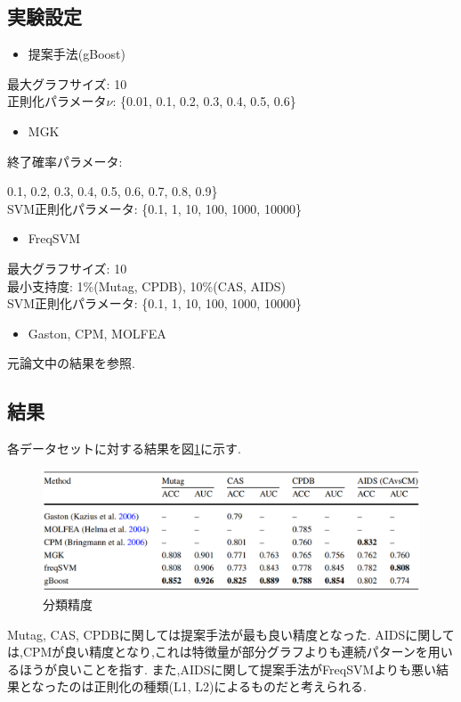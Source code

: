 \documentclass{zasshi-prml3}
\theoremstyle{definition}
\begin{document}
\subsection{実験設定}
\begin{itemize}
	\item 提案手法(gBoost)
\end{itemize}
最大グラフサイズ: 10\\
正則化パラメータ$\nu$: \{0.01, 0.1, 0.2, 0.3, 0.4, 0.5, 0.6\}
\begin{itemize}
	\item MGK
\end{itemize}
終了確率パラメータ: {0.1, 0.2, 0.3, 0.4, 0.5, 0.6, 0.7, 0.8, 0.9\}\\
SVM正則化パラメータ: \{0.1, 1, 10, 100, 1000, 10000\}
\begin{itemize}
	\item FreqSVM
\end{itemize}
最大グラフサイズ: 10\\
最小支持度: 1\%(Mutag, CPDB), 10\%(CAS, AIDS)\\
SVM正則化パラメータ: \{0.1, 1, 10, 100, 1000, 10000\}
\begin{itemize}
	\item Gaston, CPM, MOLFEA
\end{itemize}
元論文中の結果を参照.

\subsection{結果}
各データセットに対する結果を図\ref{performance}に示す.
\begin{figure}[t]
	\centering
	\includegraphics[width=150mm]{figure/performance.png}
	\caption{分類精度}
	\label{performance}
\end{figure}
Mutag, CAS, CPDBに関しては提案手法が最も良い精度となった.
AIDSに関しては,CPMが良い精度となり,これは特徴量が部分グラフよりも連続パターンを用いるほうが良いことを指す.
また,AIDSに関して提案手法がFreqSVMよりも悪い結果となったのは正則化の種類(L1, L2)によるものだと考えられる.

}
\end{document}
